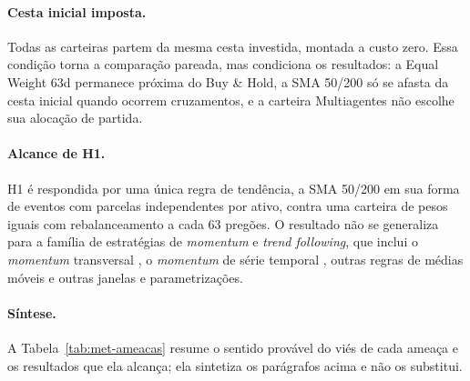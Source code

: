 \paragraph*{Cesta inicial imposta.} Todas as carteiras partem da mesma cesta investida, montada a custo zero. Essa condição torna a comparação pareada, mas condiciona os resultados: a Equal Weight 63d permanece próxima do Buy \& Hold, a SMA 50/200 só se afasta da cesta inicial quando ocorrem cruzamentos, e a carteira Multiagentes não escolhe sua alocação de partida.

\paragraph*{Alcance de H1.} H1 é respondida por uma única regra de tendência, a SMA 50/200 em sua forma de eventos com parcelas independentes por ativo, contra uma carteira de pesos iguais com rebalanceamento a cada 63 pregões. O resultado não se generaliza para a família de estratégias de \textit{momentum} e \textit{trend following}, que inclui o \textit{momentum} transversal \citep{JegadeeshTitman1993}, o \textit{momentum} de série temporal \citep{Moskowitz2012}, outras regras de médias móveis \citep{Brock1992} e outras janelas e parametrizações.

\paragraph*{Síntese.} A Tabela~\ref{tab:met-ameacas} resume o sentido provável do viés de cada ameaça e os resultados que ela alcança; ela sintetiza os parágrafos acima e não os substitui.

